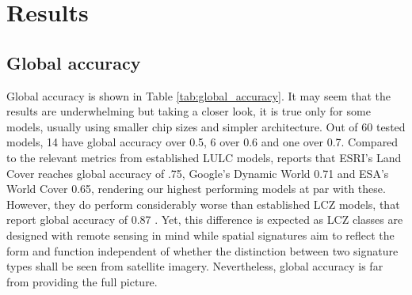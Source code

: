 \section{Results} %
\label{sec:results}
\subsection*{Global accuracy}
Global accuracy is shown in Table \ref{tab:global_accuracy}. It may seem that the
results are underwhelming but taking a closer look, it is true only for some models,
usually using smaller chip sizes and simpler architecture. Out of 60 tested models,
14 have global accuracy over 0.5, 6 over 0.6 and one over 0.7. Compared to the relevant
metrics from established LULC models, \citealp{venter2022global} reports that ESRI's
Land Cover reaches global accuracy of .75, Google's Dynamic World 0.71 and ESA's World
Cover 0.65, rendering our highest performing models at par with these. However, they
do perform considerably worse than established LCZ models, that report global accuracy of
0.87 \citep{taubenbock2020}. Yet, this difference is expected as LCZ classes are designed with remote sensing
in mind while spatial signatures aim to reflect the form and function independent of whether
the distinction between two signature types shall be seen from satellite imagery. Nevertheless,
global accuracy is far from providing the full picture.

